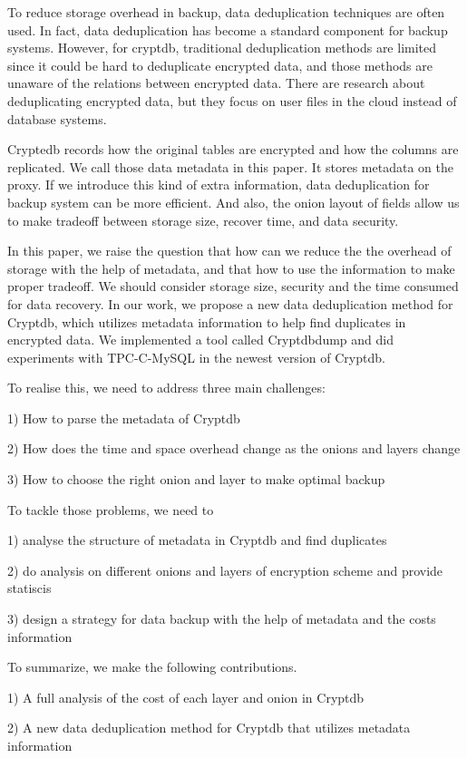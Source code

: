 To reduce storage overhead in backup, data deduplication techniques are often used. In fact, data deduplication has become a standard component for backup systems\citep{fu2015design}. However, for cryptdb, traditional deduplication methods are limited since it could be hard to deduplicate encrypted data, and those methods are unaware of the relations between encrypted data. There are research about deduplicating encrypted data, but they focus on user files in the cloud instead of database systems. 

Cryptedb records how the original tables are encrypted and how the columns are replicated. We call those data metadata in this paper. It stores metadata on the proxy. If we introduce this kind of extra information, data deduplication for backup system can be more efficient. And also, the onion layout of fields allow us to make tradeoff between storage size, recover time, and data security.


In this paper, we raise the question that how can we reduce the the overhead of storage with the help of metadata, and that how to use the information to make proper tradeoff. We should consider storage size, security and the time consumed for data recovery. In our work, we propose a new data deduplication method for Cryptdb, which utilizes metadata information to help find duplicates in encrypted data. We implemented a tool called Cryptdbdump and did experiments with TPC-C-MySQL in the newest version of Cryptdb.


To realise this, we need to address three main challenges:

1) How to parse the metadata of Cryptdb

2) How  does the time and space overhead change as the onions and layers change

3) How to choose the right onion and layer to make optimal backup


To tackle those problems, we need to

1) analyse the structure of metadata in Cryptdb and find duplicates

2) do analysis on different onions and layers of encryption scheme and provide statiscis

3) design a strategy for data backup with the help of metadata and the costs information 

To summarize, we make the following contributions.

1) A full analysis of the cost of each layer and onion in Cryptdb

2) A new data deduplication method for Cryptdb that utilizes metadata information 

